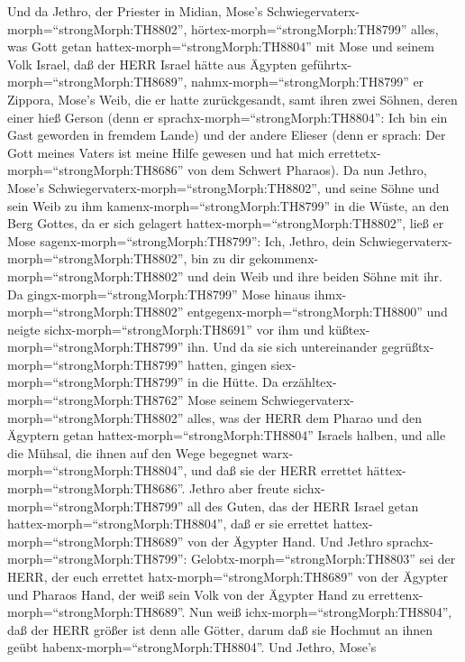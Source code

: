  Und da Jethro, der Priester in Midian, Mose's
Schwiegervaterx-morph=``strongMorph:TH8802'',
hörtex-morph=``strongMorph:TH8799'' alles, was Gott getan
hattex-morph=``strongMorph:TH8804'' mit Mose und seinem Volk Israel, daß
der HERR Israel hätte aus Ägypten geführtx-morph=``strongMorph:TH8689'',
 nahmx-morph=``strongMorph:TH8799'' er Zippora, Mose's Weib,
die er hatte zurückgesandt,  samt ihren zwei Söhnen, deren
einer hieß Gerson (denn er sprachx-morph=``strongMorph:TH8804'': Ich bin
ein Gast geworden in fremdem Lande)  und der andere Elieser
(denn er sprach: Der Gott meines Vaters ist meine Hilfe gewesen und hat
mich errettetx-morph=``strongMorph:TH8686'' von dem Schwert Pharaos).
 Da nun Jethro, Mose's
Schwiegervaterx-morph=``strongMorph:TH8802'', und seine Söhne und sein
Weib zu ihm kamenx-morph=``strongMorph:TH8799'' in die Wüste, an den
Berg Gottes, da er sich gelagert hattex-morph=``strongMorph:TH8802'',
 ließ er Mose sagenx-morph=``strongMorph:TH8799'': Ich,
Jethro, dein Schwiegervaterx-morph=``strongMorph:TH8802'', bin zu dir
gekommenx-morph=``strongMorph:TH8802'' und dein Weib und ihre beiden
Söhne mit ihr.  Da gingx-morph=``strongMorph:TH8799'' Mose
hinaus ihmx-morph=``strongMorph:TH8802''
entgegenx-morph=``strongMorph:TH8800'' und neigte
sichx-morph=``strongMorph:TH8691'' vor ihm und
küßtex-morph=``strongMorph:TH8799'' ihn. Und da sie sich untereinander
gegrüßtx-morph=``strongMorph:TH8799'' hatten, gingen
siex-morph=``strongMorph:TH8799'' in die Hütte.  Da
erzähltex-morph=``strongMorph:TH8762'' Mose seinem
Schwiegervaterx-morph=``strongMorph:TH8802'' alles, was der HERR dem
Pharao und den Ägyptern getan hattex-morph=``strongMorph:TH8804''
Israels halben, und alle die Mühsal, die ihnen auf den Wege begegnet
warx-morph=``strongMorph:TH8804'', und daß sie der HERR errettet
hättex-morph=``strongMorph:TH8686''.  Jethro aber freute
sichx-morph=``strongMorph:TH8799'' all des Guten, das der HERR Israel
getan hattex-morph=``strongMorph:TH8804'', daß er sie errettet
hattex-morph=``strongMorph:TH8689'' von der Ägypter Hand. 
Und Jethro sprachx-morph=``strongMorph:TH8799'':
Gelobtx-morph=``strongMorph:TH8803'' sei der HERR, der euch errettet
hatx-morph=``strongMorph:TH8689'' von der Ägypter und Pharaos Hand, der
weiß sein Volk von der Ägypter Hand zu
errettenx-morph=``strongMorph:TH8689''.  Nun weiß
ichx-morph=``strongMorph:TH8804'', daß der HERR größer ist denn alle
Götter, darum daß sie Hochmut an ihnen geübt
habenx-morph=``strongMorph:TH8804''.  Und Jethro, Mose's
